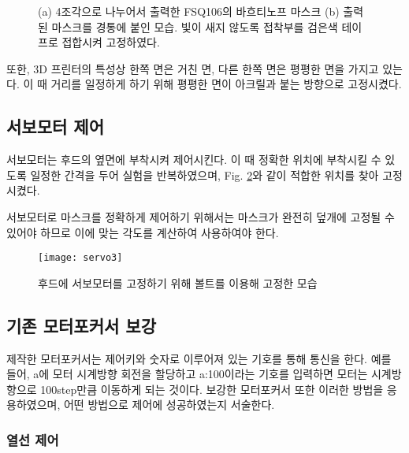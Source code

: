  
	\begin{figure}[h]
	\begin{center}
	\end{center}
	\caption{(a) 4조각으로 나누어서 출력한 FSQ106의 바흐티노프 마스크 (b) 출력된 마스크를 경통에 붙인 모습. 빛이 새지 않도록 접착부를 검은색 테이프로 접합시켜 고정하였다.}
	\label{mask}
	\end{figure}


또한, 3D 프린터의 특성상 한쪽 면은 거친 면, 다른 한쪽 면은 평평한 면을 가지고 있는다. 이 때 거리를 일정하게 하기 위해 평평한 면이 아크릴과 붙는 방향으로 고정시켰다.




\subsection{서보모터 제어}

 서보모터는 후드의 옆면에 부착시켜 제어시킨다. 이 때 정확한 위치에 부착시킬 수 있도록 일정한 간격을 두어 실험을 반복하였으며, Fig. \ref{servo}와 같이 적합한 위치를 찾아 고정시켰다. 

서보모터로 마스크를 정확하게 제어하기 위해서는 마스크가 완전히 덮개에 고정될 수 있어야 하므로 이에 맞는 각도를 계산하여 사용하여야 한다.

\begin{figure}[h]
	\begin{center}
		\texttt{[image: servo3]}
	\end{center}
	\caption{후드에 서보모터를 고정하기 위해 볼트를 이용해 고정한 모습}
	\label{servo}
\end{figure}

\subsection{기존 모터포커서 보강}
 제작한 모터포커서는 제어키와 숫자로 이루어져 있는 기호를 통해 통신을 한다. 예를 들어, a에 모터 시계방향 회전을 할당하고 a:100이라는 기호를 입력하면 모터는 시계방향으로 100step만큼 이동하게 되는 것이다. 보강한 모터포커서 또한 이러한 방법을 응용하였으며, 어떤 방법으로 제어에 성공하였는지 서술한다.
 
\subsubsection{열선 제어}

